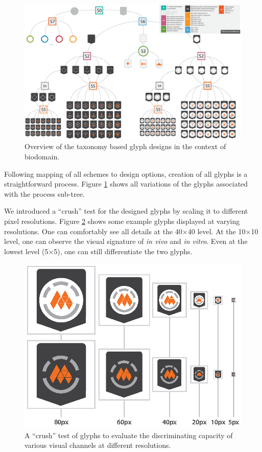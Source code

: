 \begin{figure}[t!]
\centering
\includegraphics[width=\textwidth]{images/glyph-taxonomy/full-tree.eps}
\caption{Overview of the taxonomy based glyph designs in the context of biodomain.}
\label{fig:full-tree}
\vspace{-5pt}
\end{figure}

Following mapping of all schemes to design options, creation of all glyphs is a straightforward process.
Figure \ref{fig:full-tree} shows all variations of the glyphs associated with the process sub-tree.

We introduced a ``crush'' test for the designed glyphs by scaling it to different pixel resolutions.
Figure \ref{fig:crash-test} shows some example glyphs displayed at varying resolutions.
One can comfortably see all details at the 40$\times$40 level.
At the 10$\times$10 level, one can observe the visual signature of \emph{in vivo} and \emph{in vitro}.
Even at the lowest level (5$\times$5), one can still differentiate the two glyphs. 

\begin{figure}[t!]
\centering
\includegraphics[scale=1]{images/glyph-taxonomy/crash-test.eps}
\caption{A ``crush'' test of glyphs to evaluate the discriminating capacity of various visual channels at different resolutions.}
\label{fig:crash-test}
\vspace{-5pt}
\end{figure}

